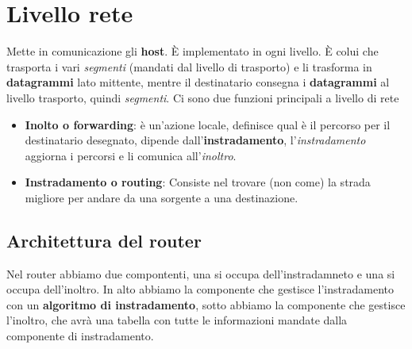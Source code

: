 \section{Livello rete}
Mette in comunicazione gli \textbf{host}. È implementato in ogni livello. È colui che trasporta i vari \textit{segmenti} (mandati dal livello di trasporto) e li trasforma in \textbf{datagrammi} lato mittente, mentre il destinatario consegna i \textbf{datagrammi} al livello trasporto, quindi \textit{segmenti}.
Ci sono due funzioni principali a livello di rete 
\begin{itemize}
  \item \textbf{Inolto o forwarding}: è un'azione locale, definisce qual è il percorso per il destinatario desegnato, dipende dall'\textbf{instradamento}, l'\textit{instradamento} aggiorna i percorsi e li comunica all'\textit{inoltro}.
  \item \textbf{Instradamento o routing}: Consiste nel trovare (non come) la strada migliore per andare da una sorgente a una destinazione.
\end{itemize}

\subsection{Architettura del router}
Nel router abbiamo due compontenti, una si occupa dell'instradamneto e una si occupa dell'inoltro. 
In alto abbiamo la componente che gestisce l'instradamento con un \textbf{algoritmo di instradamento}, sotto abbiamo la componente che gestisce l'inoltro, che avrà una tabella con tutte le informazioni mandate dalla componente di instradamento. 

